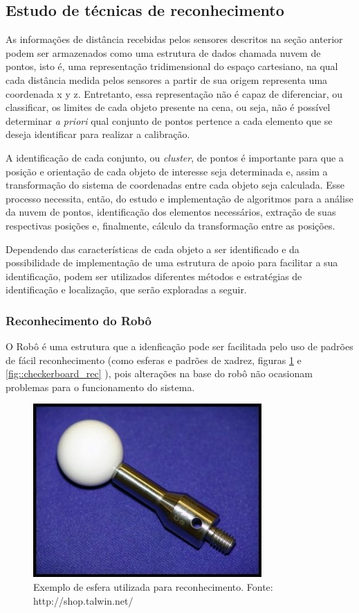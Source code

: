 \subsection{Estudo de técnicas de reconhecimento} 

As informações de distância recebidas pelos sensores descritos na seção
anterior podem ser armazenados como uma estrutura de dados chamada nuvem de
pontos, isto é, uma representação tridimensional do espaço cartesiano, na qual cada distância medida pelos
sensores a partir de sua origem representa uma coordenada x y z.
Entretanto, essa representação não é capaz de diferenciar, ou classificar, os
limites de cada objeto presente na cena, ou seja, não é possível determinar
\textit{a priori} qual conjunto de pontos pertence a cada elemento que se deseja
identificar para realizar a calibração.

A identificação de cada conjunto, ou \textit{cluster}, de pontos é importante
para que a posição e orientação de cada objeto de interesse seja determinada e,
assim a transformação do sistema de coordenadas entre cada objeto seja
calculada. Esse processo necessita, então, do estudo e implementação de
algoritmos para a análise da nuvem de pontos, identificação dos elementos
necessários, extração de suas respectivas posições e, finalmente, cálculo da
transformação entre as posições. 

Dependendo das características de cada objeto a ser identificado e da
possibilidade de implementação de uma estrutura de apoio para facilitar a sua
identificação, podem ser utilizados diferentes métodos e estratégias de
identificação e localização, que serão exploradas a seguir.

\subsubsection{Reconhecimento do Robô}

O Robô é uma estrutura que a idenficação pode ser facilitada pelo uso de
padrões de fácil reconhecimento (como esferas e padrões de xadrez, figuras
\ref{fig::sphere_rec} e \ref{fig::checkerboard_rec} ), pois alterações na base
do robô não ocasionam problemas para o funcionamento do sistema.


\begin{figure}[h!]
   \centering
   \includegraphics[width=0.6\columnwidth]{detail/figs/localizacao/sphere_rec}
   \caption{Exemplo de esfera utilizada para reconhecimento. Fonte:
   http://shop.talwin.net/}
   \label{fig::sphere_rec}
\end{figure}



